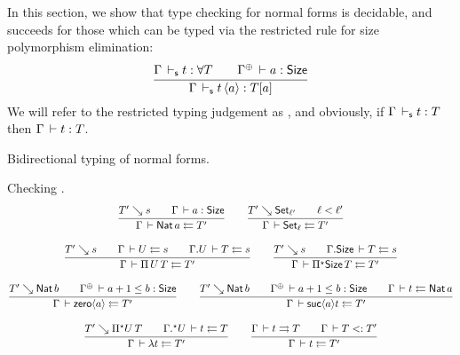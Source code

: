 
In this section, we show that type checking for normal forms is decidable, and succeeds for those which can be typed via the restricted rule for size polymorphism elimination:
\[
  \ru{\Gamma \ders t : \forall T \qquad
      \resurrect\Gamma \der a : \Size
    }{\Gamma \ders t\, \ann a : T[a]}
\]
We will refer to the restricted typing judgement as , and obviously,
if\/ $\Gamma \,\vdash_\mathsf{s} t : T$ then $\Gamma \,\vdash t : T$.

Bidirectional typing of normal forms.

Checking .
\begin{gather*}
  \ru{T' \evalsto s \qquad
      \Gamma \der a : \Size
    }{\Gamma \der \Nat a \jchk T'}
\qquad
  \ru{T' \evalsto \Set[\ell'] \qquad \ell < \ell'
    }{\Gamma \der \Set[\ell] \jchk T'}
\\[2ex]
  \ru{T' \evalsto s \qquad
      \Gamma \der U \jchk s \qquad
      \cext \Gamma U \der T \jchk s
    }{\Gamma \der \piT U T \jchk T'}
\qquad
  \ru{T' \evalsto s \qquad
      \cext \Gamma \Size \der T \jchk s
    }{\Gamma \der \epiT \Size T \jchk T'}
\\[2ex]
  \ru{T' \evalsto \Nat b \qquad
      \resurrect \Gamma \der a+1 \leq b : \Size
    }{\Gamma \der \zero a \jchk T'}
\qquad
  \ru{T' \evalsto \Nat b \qquad
      \resurrect \Gamma \der a+1 \leq b : \Size \qquad
      \Gamma \der t \jchk \Nat a
    }{\Gamma \der \suc a t \jchk T'}
\\[2ex]
  \ru{T' \evalsto \epiT U T \qquad
      \eext \Gamma U \der t \jchk T
    }{\Gamma \der \lambda t \jchk T'}
\qquad
  \ru{\Gamma \der t \jinf T \qquad \Gamma \der T \asub T'
    }{\Gamma \der t \jchk T'}
\end{gather*}

